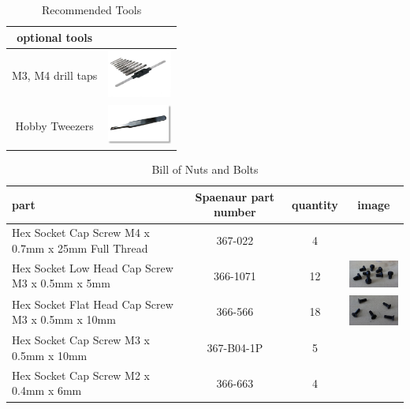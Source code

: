\documentclass[12pt,titlepage,oneside]{memoir}
\begin{document}
\begin{table}[!h]
\begin{tabular}{c | c}
\hline
optional tools & \\
\hline
M3, M4 drill taps  & \includegraphics[width=80px]{picture/taps.jpg}\\
Hobby Tweezers & \includegraphics[width=80px]{picture/tweezer.jpg}
\end{tabular}
\caption{Recommended Tools}
\label{table:tools}
\end{table}


\begin{table}[!h]
\begin{tabular}{p{5cm} | c | c | c }
part & Spaenaur part number & quantity & image \\
\hline
Hex Socket Cap Screw M4 x 0.7mm x 25mm Full Thread & 367-022 & 4 & \\
Hex Socket Low Head Cap Screw M3 x 0.5mm x 5mm	& 366-1071 & 12 &\includegraphics[width=80px]{hw/M3X06LHC.jpg} \\
Hex Socket Flat Head Cap Screw M3 x 0.5mm x 10mm & 366-566 & 18 & \includegraphics[width=80px]{hw/M3X10FC.jpg}\\
Hex Socket Cap Screw M3 x 0.5mm x 10mm & 367-B04-1P	& 5 & \\
Hex Socket Cap Screw M2 x 0.4mm x 6mm	& 366-663 & 4 & \\
\end{tabular}
\caption{Bill of Nuts and Bolts}
\label{table:screws}
\end{table}
\end{document}
